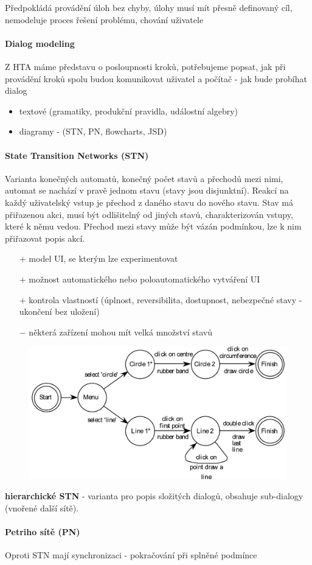 Předpokládá provádění úloh bez chyby, úlohy musí mít přesně definovaný cíl, nemodeluje proces řešení problému, chování uživatele

\paragraph{Dialog modeling}
Z HTA máme představu o posloupnosti kroků, potřebujeme popsat, jak při provádění kroků spolu budou komunikovat uživatel a počítač - jak bude probíhat dialog
\begin{itemize}[itemsep=0px]
\item textové (gramatiky, produkční pravidla, událostní algebry)
\item diagramy - (STN, PN, flowcharts, JSD)
\end{itemize}

\paragraph{State Transition Networks (STN)}
Varianta konečných automatů, konečný počet stavů a přechodů mezi nimi, automat se nachází v pravě jednom stavu (stavy jsou disjunktní). Reakcí na každý uživatelský vstup je přechod z daného stavu do nového stavu. Stav má přiřazenou akci, musí být odlišitelný od jiných stavů, charakterizován vstupy, které k němu vedou. Přechod mezi stavy může být vázán podmínkou, lze k nim přiřazovat popis akcí.
\begin{itemize}[itemsep=0px]
\item[$+$] model UI, se kterým lze experimentovat
\item[$+$] možnost automatického nebo poloautomatického vytváření UI
\item[$+$] kontrola vlastností (úplnost, reversibilita, dostupnost, nebezpečné stavy - ukončení bez uložení)
\item[$-$] některá zařízení mohou mít velká množství stavů
\end{itemize}

\begin{figure}[h!]
\centering
\includegraphics[width=130mm]{05/images/stn}
\end{figure}

\textbf{hierarchické STN} - varianta pro popis složitých dialogů, obsahuje sub-dialogy (vnořené další sítě).

\paragraph{Petriho sítě (PN)} Oproti STN mají synchronizaci - pokračování při splněné podmínce